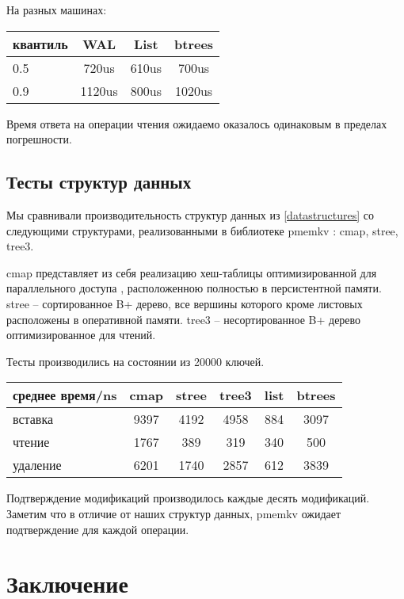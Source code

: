 \documentclass[pdftex,ptm,12pt,a4paper]{report}
\theoremstyle{definition}
\begin{document}
На разных машинах:

\begin{center}
\begin{tabular} {|l |c c c|}
\hline
квантиль & WAL & List & btrees \\
\hline
0.5 & 720us & 610us & 700us \\
0.9 & 1120us & 800us & 1020us \\
\hline
\end{tabular}
\end{center}

Время ответа на операции чтения ожидаемо оказалось одинаковым в пределах погрешности.

\section{Тесты структур данных}
\label{pmemkvtests}

Мы сравнивали производительность структур данных из \ref{datastructures} со следующими структурами, реализованными в
библиотеке pmemkv \cite{pmemkv}: cmap, stree, tree3.

cmap представляет из себя реализацию хеш-таблицы оптимизированной для параллельного доступа \cite{malakhov2015perbucket}, расположенною полностью в персистентной памяти.
stree -- сортированное B+ дерево, все вершины которого кроме листовых расположены в оперативной памяти.
tree3 -- несортированное B+ дерево оптимизированное для чтений.

Тесты производились на состоянии из 20000 ключей.

\begin{center}
\begin{tabular} {|l| c c c c c|}
\hline
среднее время/ns & cmap & stree & tree3 & list & btrees \\
\hline
вставка & 9397 & 4192 & 4958 & 884 & 3097 \\
чтение & 1767 & 389 & 319 & 340 & 500 \\
удаление & 6201 & 1740 & 2857 & 612 & 3839 \\
\hline
\end{tabular}
\end{center}

Подтверждение модификаций производилось каждые десять модификаций. Заметим что в отличие от наших структур данных, pmemkv ожидает подтверждение для каждой операции.

\chapter{Заключение}



\end{document}
